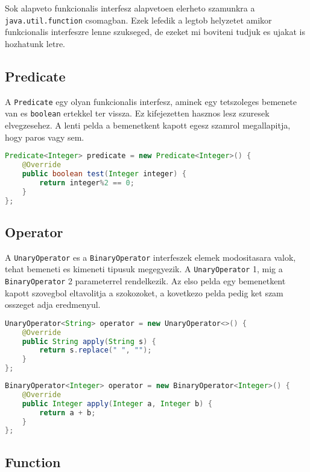 \documentclass{article}
\let\l\lstinline
\begin{document}
Sok alapveto funkcionalis interfesz alapvetoen elerheto szamunkra a \l{java.util.function} csomagban. Ezek lefedik a legtob helyzetet amikor funkcionalis interfeszre lenne szukseged, de ezeket mi boviteni tudjuk es ujakat is hozhatunk letre.

\subsection{Predicate}

A \l{Predicate} egy olyan funkcionalis interfesz, aminek egy tetszoleges bemenete van es \l{boolean} ertekkel ter vissza. Ez kifejezetten hasznos lesz szuresek elvegzesehez. A lenti pelda a bemenetkent kapott egesz szamrol megallapitja, hogy paros vagy sem.

\begin{lstlisting}[language=Java, caption=Pelda Predicate]
Predicate<Integer> predicate = new Predicate<Integer>() {
	@Override
	public boolean test(Integer integer) {
		return integer%2 == 0;
	}
};
\end{lstlisting}

\subsection{Operator}

A \l{UnaryOperator} es a \l{BinaryOperator} interfeszek elemek modositasara valok, tehat bemeneti es kimeneti tipusuk megegyezik. A \l{UnaryOperator} 1, mig a \l{BinaryOperator} 2 parameterrel rendelkezik. Az elso pelda egy bemenetkent kapott szovegbol eltavolitja a szokozoket, a kovetkezo pelda pedig ket szam osszeget adja eredmenyul.

\begin{lstlisting}[language=Java, caption=Pelda UnaryOperator]
UnaryOperator<String> operator = new UnaryOperator<>() {
	@Override
	public String apply(String s) {
		return s.replace(" ", "");
	}
};
\end{lstlisting}

\begin{lstlisting}[language=Java, caption=Pelda BinaryOperator]
BinaryOperator<Integer> operator = new BinaryOperator<Integer>() {
	@Override
	public Integer apply(Integer a, Integer b) {
		return a + b;
	}
};
\end{lstlisting}

\subsection{Function}
\end{document}
